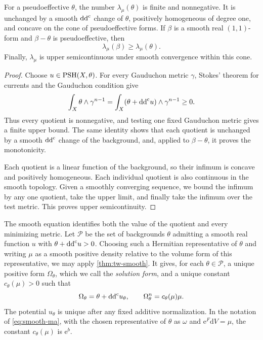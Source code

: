 \begin{proposition}\label{prop:gaud-volume-elementary}
For a pseudoeffective $\theta$, the number $\lambda_\mu(\theta)$ is finite and nonnegative. It is unchanged by a smooth $\mathrm{dd}^{\mathrm{c}}$ change of $\theta$, positively homogeneous of degree one, and concave on the cone of pseudoeffective forms. If $\beta$ is a smooth real $(1,1)$-form and $\beta-\theta$ is pseudoeffective, then
\[
 \lambda_\mu(\beta)\geq\lambda_\mu(\theta).
\]
Finally, $\lambda_\mu$ is upper semicontinuous under smooth convergence within this cone.
\end{proposition}
\begin{proof}
Choose $u\in\mathrm{PSH}(X,\theta)$. For every Gauduchon metric $\gamma$, Stokes' theorem for currents and the Gauduchon condition give
\[
 \int_X\theta\wedge\gamma^{n-1}
 =\int_X(\theta+\mathrm{dd}^{\mathrm{c}} u)\wedge\gamma^{n-1}\geq0.
\]
Thus every quotient is nonnegative, and testing one fixed Gauduchon metric gives a finite upper bound. The same identity shows that each quotient is unchanged by a smooth $\mathrm{dd}^{\mathrm{c}}$ change of the background, and, applied to $\beta-\theta$, it proves the monotonicity.

Each quotient is a linear function of the background, so their infimum is concave and positively homogeneous. Each individual quotient is also continuous in the smooth topology. Given a smoothly converging sequence, we bound the infimum by any one quotient, take the upper limit, and finally take the infimum over the test metric. This proves upper semicontinuity.
\end{proof}

The smooth equation identifies both the value of the quotient and every minimizing metric. Let $\mathscr P$ be the set of backgrounds $\theta$ admitting a smooth real function $u$ with $\theta+\mathrm{dd}^{\mathrm{c}} u>0$. Choosing such a Hermitian representative of $\theta$ and writing $\mu$ as a smooth positive density relative to the volume form of this representative, we may apply \cref{thm:tw-smooth}. It gives, for each $\theta\in\mathscr P$, a unique positive form $\Omega_\theta$, which we call the \emph{solution form}, and a unique constant $c_\theta(\mu)>0$ such that
\[
 \Omega_\theta=\theta+\mathrm{dd}^{\mathrm{c}} u_\theta,
 \qquad \Omega_\theta^n=c_\theta(\mu)\mu.
\]
The potential $u_\theta$ is unique after any fixed additive normalization. In the notation of \eqref{eq:smooth-ma}, with the chosen representative of $\theta$ as $\omega$ and $\mathrm e^F\mathrm{d}V=\mu$, the constant $c_\theta(\mu)$ is $\mathrm e^b$.

